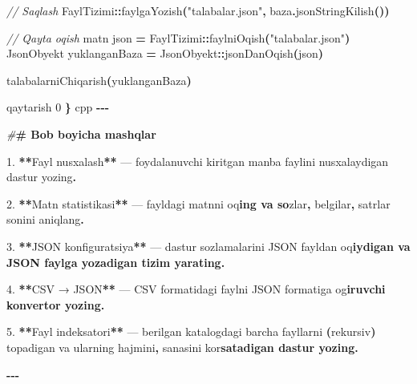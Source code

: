 \documentclass[a4paper,11pt,twoside,openright]{book}
\newenvironment{Shaded}{\begin{snugshade}}{\end{snugshade}}
\newcommand{\CharTok}[1]{\textcolor[rgb]{0.31,0.60,0.02}{#1}}
\newcommand{\CommentTok}[1]{\textcolor[rgb]{0.56,0.35,0.01}{\textit{#1}}}
\newcommand{\DecValTok}[1]{\textcolor[rgb]{0.00,0.00,0.81}{#1}}
\newcommand{\ErrorTok}[1]{\textcolor[rgb]{0.64,0.00,0.00}{\textbf{#1}}}
\newcommand{\FloatTok}[1]{\textcolor[rgb]{0.00,0.00,0.81}{#1}}
\newcommand{\NormalTok}[1]{#1}
\newcommand{\OperatorTok}[1]{\textcolor[rgb]{0.81,0.36,0.00}{\textbf{#1}}}
\newcommand{\PreprocessorTok}[1]{\textcolor[rgb]{0.56,0.35,0.01}{\textit{#1}}}
\newcommand{\StringTok}[1]{\textcolor[rgb]{0.31,0.60,0.02}{#1}}
\begin{document}
\begin{Shaded}
\begin{Highlighting}[]
    \CommentTok{// Saqlash}
\NormalTok{    FaylTizimi}\OperatorTok{::}\NormalTok{faylgaYozish}\OperatorTok{(}\StringTok{"talabalar.json"}\OperatorTok{,}\NormalTok{ baza}\OperatorTok{.}\NormalTok{jsonStringKilish}\OperatorTok{())}

    \CommentTok{// Qayta o\textquotesingle{}qish}
\NormalTok{    matn json }\OperatorTok{=}\NormalTok{ FaylTizimi}\OperatorTok{::}\NormalTok{faylniOqish}\OperatorTok{(}\StringTok{"talabalar.json"}\OperatorTok{)}
\NormalTok{    JsonObyekt yuklanganBaza }\OperatorTok{=}\NormalTok{ JsonObyekt}\OperatorTok{::}\NormalTok{jsonDanOqish}\OperatorTok{(}\NormalTok{json}\OperatorTok{)}

\NormalTok{    talabalarniChiqarish}\OperatorTok{(}\NormalTok{yuklanganBaza}\OperatorTok{)}

\NormalTok{    qaytarish }\DecValTok{0}
\OperatorTok{\}}
\ErrorTok{\textasciigrave{}\textasciigrave{}\textasciigrave{}}\NormalTok{cpp}
\OperatorTok{{-}{-}{-}}

\PreprocessorTok{\#}\ErrorTok{\# Bob bo\textquotesingle{}yicha mashqlar}

\FloatTok{1.} \OperatorTok{**}\NormalTok{Fayl nusxalash}\OperatorTok{**}\NormalTok{ — foydalanuvchi kiritgan manba faylini nusxalaydigan dastur yozing}\OperatorTok{.}

\FloatTok{2.} \OperatorTok{**}\NormalTok{Matn statistikasi}\OperatorTok{**}\NormalTok{ — fayldagi matnni o}\CharTok{\textquotesingle{}q}\ErrorTok{ing va so}\CharTok{\textquotesingle{}}\NormalTok{zlar}\OperatorTok{,}\NormalTok{ belgilar}\OperatorTok{,}\NormalTok{ satrlar sonini aniqlang}\OperatorTok{.}

\FloatTok{3.} \OperatorTok{**}\NormalTok{JSON konfiguratsiya}\OperatorTok{**}\NormalTok{ — dastur sozlamalarini JSON fayldan o}\CharTok{\textquotesingle{}q}\ErrorTok{iydigan va JSON faylga yozadigan tizim yarating.}

\FloatTok{4.} \OperatorTok{**}\NormalTok{CSV → JSON}\OperatorTok{**}\NormalTok{ — CSV formatidagi faylni JSON formatiga o}\CharTok{\textquotesingle{}g}\ErrorTok{iruvchi konvertor yozing.}

\FloatTok{5.} \OperatorTok{**}\NormalTok{Fayl indeksatori}\OperatorTok{**}\NormalTok{ — berilgan katalogdagi barcha fayllarni }\OperatorTok{(}\NormalTok{rekursiv}\OperatorTok{)}\NormalTok{ topadigan va ularning hajmini}\OperatorTok{,}\NormalTok{ sanasini ko}\CharTok{\textquotesingle{}r}\ErrorTok{satadigan dastur yozing.}

\OperatorTok{{-}{-}{-}}


\end{Highlighting}
\end{Shaded}
\end{document}
